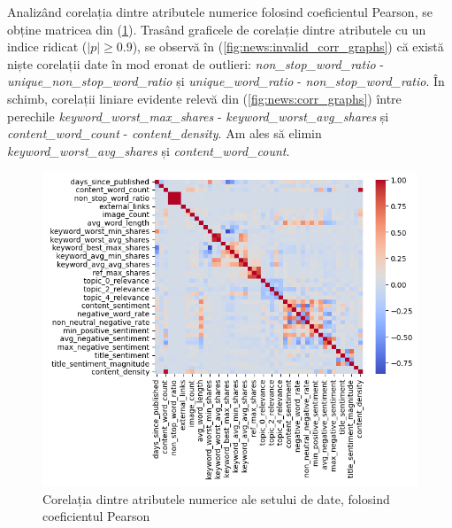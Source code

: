 \documentclass{article}
\begin{document}
Analizând corelația dintre atributele numerice folosind coeficientul Pearson,
se obține matricea din (\ref{fig:news:corr}). Trasând graficele de corelație 
dintre atributele cu un indice ridicat ($|p| \geq 0.9$), se observă în 
(\ref{fig:news:invalid_corr_graphs}) că există niște corelații date în mod 
eronat de outlieri: \textit{non\_stop\_word\_ratio} - 
\textit{unique\_non\_stop\_word\_ratio} și \textit{unique\_word\_ratio} - 
\textit{non\_stop\_word\_ratio}. În schimb, corelații liniare evidente relevă 
din (\ref{fig:news:corr_graphs}) între perechile 
\textit{keyword\_worst\_max\_shares} - \textit{keyword\_worst\_avg\_shares} și 
\textit{content\_word\_count} - \textit{content\_density}. Am ales să elimin
\textit{keyword\_worst\_avg\_shares} și \textit{content\_word\_count}.

\begin{figure}[htb]
    \centering
    \includegraphics[scale=0.6]{news_popularity/analysis/correlation/matrix.png}
    \caption{Corelația dintre atributele numerice ale setului de date, folosind 
    coeficientul Pearson}
    \label{fig:news:corr}
\end{figure}
\end{document}
